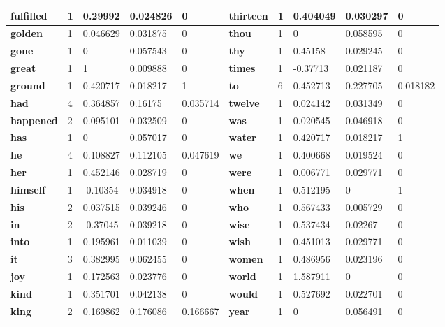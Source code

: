 \begin{table}[]
\begin{tabular}{|l|l|l|l|l|l|l|l|l|l|}
\textbf{fulfilled}     & 1 & 0.29992  & 0.024826 & 0        & \textbf{thirteen}  & 1 & 0.404049 & 0.030297 & 0        \\ \hline
\textbf{golden}        & 1 & 0.046629 & 0.031875 & 0        & \textbf{thou}      & 1 & 0        & 0.058595 & 0        \\ \hline
\textbf{gone}          & 1 & 0        & 0.057543 & 0        & \textbf{thy}       & 1 & 0.45158  & 0.029245 & 0        \\ \hline
\textbf{great}         & 1 & 1        & 0.009888 & 0        & \textbf{times}     & 1 & -0.37713 & 0.021187 & 0        \\ \hline
\textbf{ground}        & 1 & 0.420717 & 0.018217 & 1        & \textbf{to}        & 6 & 0.452713 & 0.227705 & 0.018182 \\ \hline
\textbf{had}           & 4 & 0.364857 & 0.16175  & 0.035714 & \textbf{twelve}    & 1 & 0.024142 & 0.031349 & 0        \\ \hline
\textbf{happened}      & 2 & 0.095101 & 0.032509 & 0        & \textbf{was}       & 1 & 0.020545 & 0.046918 & 0        \\ \hline
\textbf{has}           & 1 & 0        & 0.057017 & 0        & \textbf{water}     & 1 & 0.420717 & 0.018217 & 1        \\ \hline
\textbf{he}            & 4 & 0.108827 & 0.112105 & 0.047619 & \textbf{we}        & 1 & 0.400668 & 0.019524 & 0        \\ \hline
\textbf{her}           & 1 & 0.452146 & 0.028719 & 0        & \textbf{were}      & 1 & 0.006771 & 0.029771 & 0        \\ \hline
\textbf{himself}       & 1 & -0.10354 & 0.034918 & 0        & \textbf{when}      & 1 & 0.512195 & 0        & 1        \\ \hline
\textbf{his}           & 2 & 0.037515 & 0.039246 & 0        & \textbf{who}       & 1 & 0.567433 & 0.005729 & 0        \\ \hline
\textbf{in}            & 2 & -0.37045 & 0.039218 & 0        & \textbf{wise}      & 1 & 0.537434 & 0.02267  & 0        \\ \hline
\textbf{into}          & 1 & 0.195961 & 0.011039 & 0        & \textbf{wish}      & 1 & 0.451013 & 0.029771 & 0        \\ \hline
\textbf{it}            & 3 & 0.382995 & 0.062455 & 0        & \textbf{women}     & 1 & 0.486956 & 0.023196 & 0        \\ \hline
\textbf{joy}           & 1 & 0.172563 & 0.023776 & 0        & \textbf{world}     & 1 & 1.587911 & 0        & 0        \\ \hline
\textbf{kind}          & 1 & 0.351701 & 0.042138 & 0        & \textbf{would}     & 1 & 0.527692 & 0.022701 & 0        \\ \hline
\textbf{king}          & 2 & 0.169862 & 0.176086 & 0.166667 & \textbf{year}      & 1 & 0        & 0.056491 & 0        \\ \hline
\end{tabular}
\end{table}
